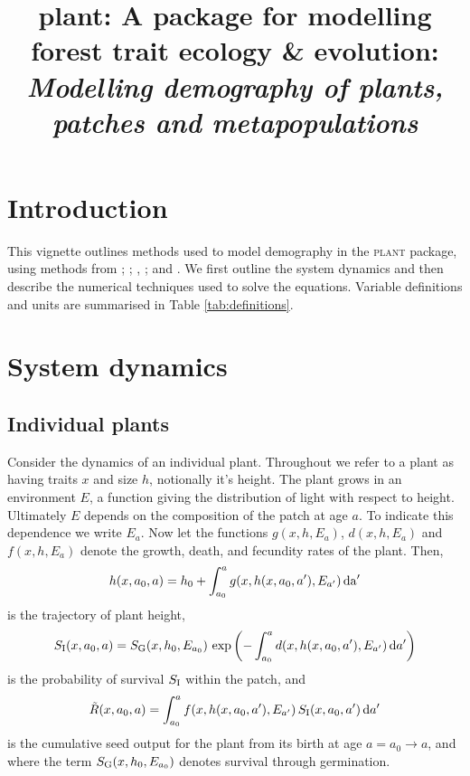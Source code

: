 \documentclass[10pt,twoside]{article}
\title{plant: A package for modelling forest trait ecology \& evolution:
\emph{Modelling demography of plants, patches and metapopulations}}
\date{}
\newcommand{\plant}{\textsc{plant}}
\begin{document}
\maketitle


\section{Introduction}\label{introduction}
This vignette outlines methods used to model demography in the {\plant}
package, using methods from \citet{Deroos-1997}; \citet{Kohyama-1993};
\citet{Moorcroft-2001}, \citet{Falster-2011}; and \citet{Falster-2015}.
We first outline the system dynamics and then describe the numerical
techniques used to solve the equations. Variable definitions and units are
summarised in Table \ref{tab:definitions}.

\section{System dynamics}\label{system-dynamics}

\subsection{Individual plants}\label{individual-plants}

Consider the dynamics of an individual plant. Throughout we refer to a
plant as having traits \(x\) and size \(h\), notionally it's height. The
plant grows in an environment \(E\), a function giving the distribution
of light with respect to height. Ultimately \(E\) depends on the
composition of the patch at age \(a\). To indicate this dependence we
write \(E_a\). Now let the functions \(g(x,h,E_a)\), \(d(x,h,E_a)\) and
\(f(x,h,E_a)\) denote the growth, death, and fecundity rates of the
plant. Then,
\begin{equation} \label{eq:size}
  h(x, a_0, a) = h_0 + \int_{a_0}^{a} g(x, h(x, a_0, a^\prime),E_{a^\prime}) \, \rm{d}a^\prime
\end{equation}
is the trajectory of plant height,
\begin{equation} \label{eq:survivalIndividual}
  S_{\rm I} (x, a_0, a) = S_{\rm G} (x,h_0, E_{a_0}) \, \exp\left(- \int_{a_0}^{a} d(x,h(x, a_0, a^\prime), E_{a^\prime}) \, {\rm d} a^\prime \right)
\end{equation}
is the probability of survival \(S_{\rm I}\) within the patch, and
\begin{equation} \label{eq:tildeR1}
  \tilde{R}(x, a_0, a) =\int_{a_0}^{a} f(x, h(x, a_0, a^\prime), E_{a^\prime}) \, S_{\rm I} (x, a_0, a^\prime) \, {\rm d} a^\prime
\end{equation}
is the cumulative seed output for the plant from its birth at age
\(a=a_0 \rightarrow a\), and where the term \(S_{\rm G} (x,h_0, E_{a_0})\)
denotes survival through germination.
\end{document}
